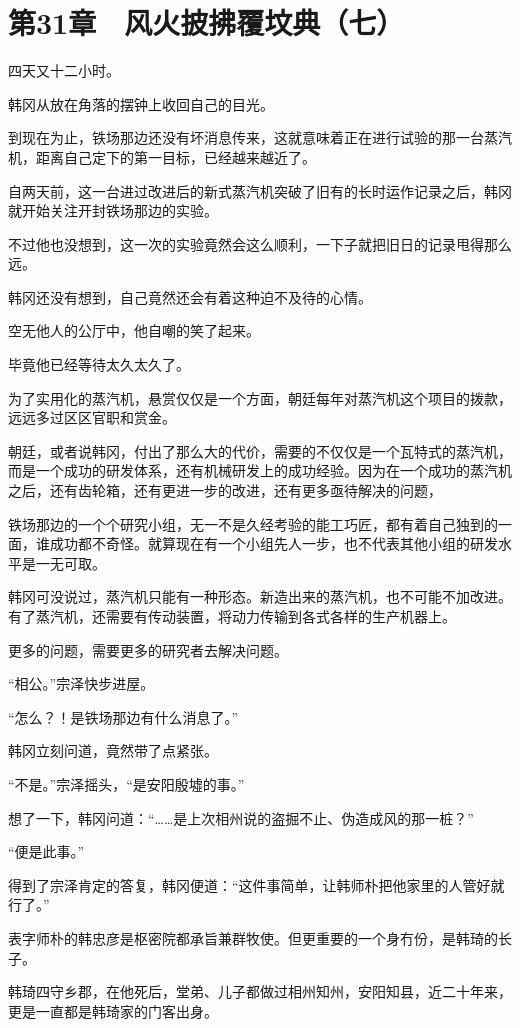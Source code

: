 \section{第31章　风火披拂覆坟典（七）}

四天又十二小时。

韩冈从放在角落的摆钟上收回自己的目光。

到现在为止，铁场那边还没有坏消息传来，这就意味着正在进行试验的那一台蒸汽机，距离自己定下的第一目标，已经越来越近了。

自两天前，这一台进过改进后的新式蒸汽机突破了旧有的长时运作记录之后，韩冈就开始关注开封铁场那边的实验。

不过他也没想到，这一次的实验竟然会这么顺利，一下子就把旧日的记录甩得那么远。

韩冈还没有想到，自己竟然还会有着这种迫不及待的心情。

空无他人的公厅中，他自嘲的笑了起来。

毕竟他已经等待太久太久了。

为了实用化的蒸汽机，悬赏仅仅是一个方面，朝廷每年对蒸汽机这个项目的拨款，远远多过区区官职和赏金。

朝廷，或者说韩冈，付出了那么大的代价，需要的不仅仅是一个瓦特式的蒸汽机，而是一个成功的研发体系，还有机械研发上的成功经验。因为在一个成功的蒸汽机之后，还有齿轮箱，还有更进一步的改进，还有更多亟待解决的问题，

铁场那边的一个个研究小组，无一不是久经考验的能工巧匠，都有着自己独到的一面，谁成功都不奇怪。就算现在有一个小组先人一步，也不代表其他小组的研发水平是一无可取。

韩冈可没说过，蒸汽机只能有一种形态。新造出来的蒸汽机，也不可能不加改进。有了蒸汽机，还需要有传动装置，将动力传输到各式各样的生产机器上。

更多的问题，需要更多的研究者去解决问题。

“相公。”宗泽快步进屋。

“怎么？！是铁场那边有什么消息了。”

韩冈立刻问道，竟然带了点紧张。

“不是。”宗泽摇头，“是安阳殷墟的事。”

想了一下，韩冈问道：“……是上次相州说的盗掘不止、伪造成风的那一桩？”

“便是此事。”

得到了宗泽肯定的答复，韩冈便道：“这件事简单，让韩师朴把他家里的人管好就行了。”

表字师朴的韩忠彦是枢密院都承旨兼群牧使。但更重要的一个身冇份，是韩琦的长子。

韩琦四守乡郡，在他死后，堂弟、儿子都做过相州知州，安阳知县，近二十年来，更是一直都是韩琦家的门客出身。

